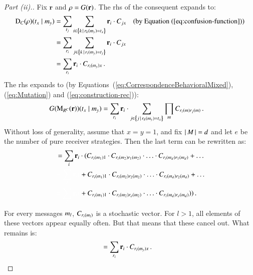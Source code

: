 \documentclass[fleqn,reqno,10pt]{article}
\renewcommand{\Rmixed}{\ensuremath{\mathrm{\mathbf{r}}}}
\newcommand{\Diff}{\ensuremath{\mathrm{D}}} %
\newcommand{\Mutate}{\ensuremath{\mathrm{M}}} %
\begin{document}
\begin{proof}[Part (ii).]
  Fix $\Rmixed$ and $\Rstrat = G(\Rmixed)$. The rhs of the consequent
  expands to:
  \begin{align*}
    \Diff_C(\Rstrat)(\state_x \probbar \messg_y) & = \sum_{\state_j}
    \sum_{i \in \set{k \setbar \Rpure_k(\messg_y) = \state_x}}
    \Rmixed_i \cdot C_{jx} && \text{(by Equation~(\ref{eq:confusion-function}))} \\
    & = \sum_{\Rpure_i} \sum_{j \in \set{k \setbar \Rpure_i(\messg_y) = \state_j}}
    \Rmixed_i \cdot C_{jx} \\
    & = \sum_{\Rpure_i} \Rmixed_i \cdot C_{\Rpure_i(\messg_y)x} \,.
  \end{align*}
  The rhs expands to (by Equations~(\ref{eq:CorrespondenceBehavioralMixed}),
  (\ref{eq:Mutation}) and (\ref{eq:construction-rec})):
  \begin{align*}
    G(\Mutate_{R^C}(\Rmixed))(\state_x \probbar \messg_y) & = \sum_{\Rpure_i}
    \Rmixed_i \cdot \sum_{j \in \set{j \setbar \Rpure_k(\messg_y) =
        \state_x}} 
    \prod_{\messg} C_{\Rpure_i(\messg)\Rpure_j(\messg)} \,.
  \end{align*}
  Without loss of generality, assume that $x=y=1$, and fix
  $\left \lvert \, M \, \right\rvert=d$ and let $e$ be the number of pure receiver
  strategies. Then the last term can be rewritten as:
  \begin{align*}
    & = \sum_{i}
    \Rmixed_i \cdot ( C_{\Rpure_i(\messg_1)1} \cdot
      C_{\Rpure_i(\messg_2)\Rpure_1(\messg_2)} \cdot \ldots \cdot
      C_{\Rpure_i(\messg_d)\Rpure_1(\messg_d)} + \ldots  \\
      & \textcolor{white}{ = \sum_{i}
    \Rmixed_i  (}  +  C_{\Rpure_i(\messg_1)1} \cdot
      C_{\Rpure_i(\messg_2)\Rpure_2(\messg_2)} \cdot \ldots \cdot
      C_{\Rpure_i(\messg_d)\Rpure_2(\messg_d)} + \ldots  \\
      & \textcolor{white}{ = \sum_{i}
    \Rmixed_i  (}  + C_{\Rpure_i(\messg_1)1} \cdot
      C_{\Rpure_i(\messg_2)\Rpure_e(\messg_2)} \cdot \ldots \cdot
      C_{\Rpure_i(\messg_d)\Rpure_e(\messg_d)}) ) \,.
  \end{align*}
  For every messages $m_l$, $C_{r_i(m_l)}$ is a stochastic
  vector. For $l>1$, all elements of these vectors appear equally
  often. But that means that these cancel out. What remains is:
  \begin{align*}
    & = \sum_{\Rpure_i} \Rmixed_i \cdot C_{\Rpure_i(\messg_y)x} \,.
  \end{align*}
\end{proof}



\printbibliography[heading=bibintoc]
\end{document}

